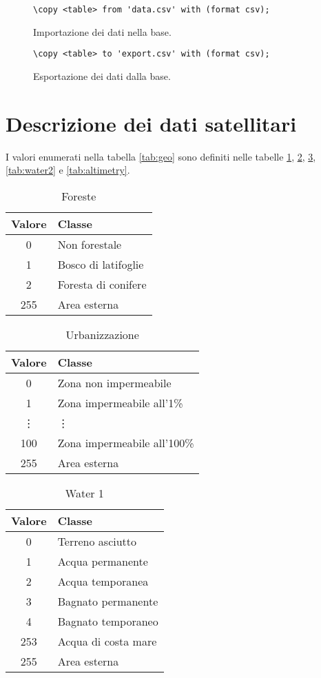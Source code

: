 \documentclass[draft]{article}
\begin{document}
\begin{figure}
\centering\verb+\copy <table> from 'data.csv' with (format csv);+
\caption{Importazione dei dati nella base.}
\label{fig:import}
\end{figure}

\begin{figure}
\centering\verb+\copy <table> to 'export.csv' with (format csv);+
\caption{Esportazione dei dati dalla base.}
\label{fig:export}
\end{figure}

\appendix

\section{Descrizione dei dati satellitari}\label{sec:desc}

I valori enumerati nella tabella \ref{tab:geo} sono definiti nelle tabelle
\ref{tab:forest}, \ref{tab:urbanization}, \ref{tab:water1}, \ref{tab:water2} e
\ref{tab:altimetry}.

\begin{table}
\centering
\begin{tabular}{|c|l|}
\hline
\textbf{Valore} & \textbf{Classe}\\
\hline
0 & Non forestale\\
1 & Bosco di latifoglie\\
2 & Foresta di conifere\\
255 & Area esterna\\
\hline
\end{tabular}
\caption{Foreste}
\label{tab:forest}
\end{table}

\begin{table}
\centering
\begin{tabular}{|c|l|}
\hline
\textbf{Valore} & \textbf{Classe}\\
\hline
0 & Zona non impermeabile\\
1 & Zona impermeabile all'1\%\\
\vdots & \vdots\\
100 & Zona impermeabile all'100\%\\
255 & Area esterna\\
\hline
\end{tabular}
\caption{Urbanizzazione}
\label{tab:urbanization}
\end{table}

\begin{table}
\centering
\begin{tabular}{|c|l|}
\hline
\textbf{Valore} & \textbf{Classe}\\
\hline
0 & Terreno asciutto\\
1 & Acqua permanente\\
2 & Acqua temporanea\\
3 & Bagnato permanente\\
4 & Bagnato temporaneo\\
253 & Acqua di costa mare\\
255 & Area esterna\\
\hline
\end{tabular}
\caption{Water 1}
\label{tab:water1}
\end{table}
\end{document}
